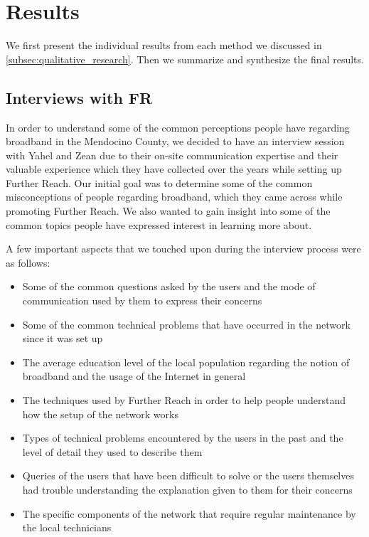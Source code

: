 \section{Results}
\label{sec:results}

We first present the individual results from each method we discussed in
\autoref{subsec:qualitative_research}. Then we summarize and synthesize the
final results.

\subsection{Interviews with FR}
\label{sec:interviews-with-fr}

In order to understand some of the common perceptions people have regarding
broadband in the Mendocino County, we decided to have an interview session
with Yahel and Zean due to their on-site communication expertise and their
valuable experience which they have collected over the years while setting up
Further Reach. Our initial goal was to determine some of the common
misconceptions of people regarding broadband, which they came across while
promoting Further Reach. We also wanted to gain insight into some of the
common topics people have expressed interest in learning more about.

A few important aspects that we touched upon during the interview process were as follows:
\begin{itemize}
\item Some of the common questions asked by the users and the mode of communication used by them to express their concerns
\item Some of the common technical problems that have occurred in the network
since it was set up
\item The average education level of the local population regarding the notion of broadband and the usage of the Internet in general
\item The techniques used by Further Reach in order to help people understand how the setup of the network works
\item Types of technical problems encountered by the users in the past and the level of detail they used to describe them
\item Queries of the users that have been difficult to solve or the users themselves had trouble understanding the explanation given to them for their concerns
\item The specific components of the network that require regular maintenance by the local technicians
\end{itemize}

